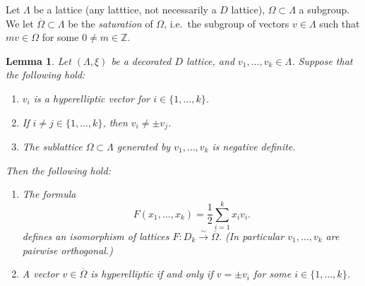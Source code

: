 \documentclass[11pt]{amsart}
\numberwithin{equation}{subsection}
\theoremstyle{plain}
\newtheorem{lemma}[theorem]{Lemma}
\theoremstyle{remark}
\theoremstyle{definition}
\newcommand{\lra}{\longrightarrow}
\newcommand{\ov}{\overline}
\newcommand{\ZZ}{{\mathbb Z}}
\begin{document}
Let $\Lambda$ be a lattice (any latttice, not necessarily a $D$ lattice), $\Omega\subset\Lambda$ a subgroup. We let $\ov{\Omega}\subset\Lambda$ be the  \emph{saturation} of $\Omega$, i.e.~the subgroup  of vectors $v\in\Lambda$ such that $mv\in\Omega$ for some $0\not=m\in\ZZ$.
%
\begin{lemma}\label{lmm:manyhyp}
%
Let $(\Lambda,\xi)$ be a decorated $D$ lattice, and  $v_1,\ldots,v_k\in\Lambda$. Suppose that the following hold:
%
\begin{enumerate}
%
\item
%
$v_i$ is a  hyperelliptic vector for  $i\in\{1,\ldots,k\}$. 
%
\item
%
If $i\not=j\in\{1,\ldots,k\}$, then $v_i\not=\pm v_j$.
%
\item
%
The sublattice $\Omega\subset\Lambda$  generated  by $v_1,\ldots,v_k$ is negative definite. 
% 
\end{enumerate}
%
Then  the following hold:
%
\begin{enumerate}
%
\item[(I)]
%
The formula
%
\begin{equation}\label{dividoperdue}
%
F(x_1,\ldots,x_k)=\frac{1}{2}\sum_{i=1}^k x_i v_i.
%
\end{equation}
%
defines an isomorphism of lattices $F\colon  D_k\overset{\sim}{\lra}\ov{\Omega}$. (In particular  $v_1,\ldots,v_k$ are pairwise orthogonal.)
%
\item[(II)]
%
A vector  $v\in\ov{\Omega}$ is  hyperelliptic if and only if $v=\pm v_i$ for some $i\in\{1,\ldots,k\}$.
% 
\end{enumerate}
%
%
\end{lemma}
%
\end{document}
